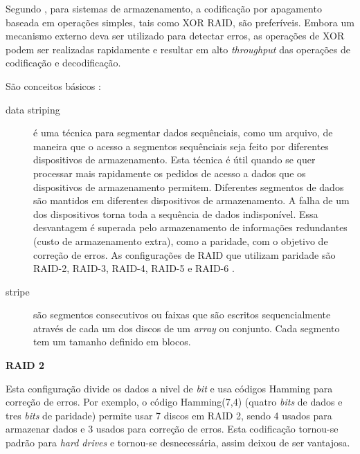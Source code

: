 Segundo \cite{Woitaszek:2007}, para sistemas de armazenamento, a
codificação por apagamento baseada em operações simples, tais como XOR
RAID, são preferíveis. Embora um mecanismo externo deva ser utilizado
para detectar erros, as operações de XOR podem ser realizadas
rapidamente e resultar em alto \emph{throughput} das operações de
codificação e decodificação.

São conceitos básicos \cite{Vadala:2002}:

\begin{description}

   \item [data striping] é uma técnica para segmentar dados sequênciais, como um arquivo, de maneira que o acesso a segmentos sequênciais seja feito por diferentes dispositivos de armazenamento. Esta técnica é útil quando se quer processar mais rapidamente os pedidos de acesso a dados que os dispositivos de armazenamento permitem. Diferentes segmentos de dados são mantidos em diferentes dispositivos de armazenamento. A falha de um dos dispositivos torna toda a sequência de dados indisponível. Essa desvantagem é superada pelo armazenamento de informações redundantes (custo de armazenamento extra), como a paridade, com o objetivo de correção de erros. As configurações de RAID que utilizam paridade são RAID-2, RAID-3, RAID-4, RAID-5 e RAID-6 \cite{DS:2010}.

   \item [stripe] são segmentos consecutivos ou faixas que são escritos sequencialmente através de cada um dos discos de um \emph{array} ou conjunto. Cada segmento tem um tamanho definido em blocos.

\end{description}

\vspace{1cm}

{\bf RAID 2}

\vspace{0.5cm}

Esta configuração divide os dados a nivel de \emph{bit} e usa códigos Hamming para correção de erros. Por exemplo, o código Hamming(7,4) (quatro \emph{bits} de dados e tres \emph{bits} de paridade) permite usar 7 discos em RAID 2, sendo 4 usados para armazenar dados e 3 usados para correção de erros. Esta codificação tornou-se padrão para \emph{hard drives} e tornou-se desnecessária, assim deixou de ser vantajosa.

\vspace{1cm}

